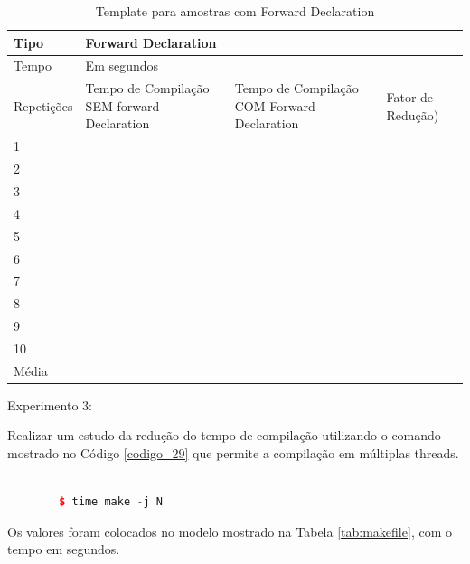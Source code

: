 \begin{table}[h]
\centering
\begin{tabular}{|l|p{3cm}|p{3cm}|p{3cm}|}
\hline
Tipo       & \multicolumn{3}{l|}{Forward Declaration}                                                                                                                            \\ \hline
Tempo      & \multicolumn{3}{l|}{Em segundos}                                                                                                                                    \\ \hline
Repetições & Tempo de Compilação SEM forward Declaration & Tempo de Compilação COM Forward Declaration & Fator de Redução) \\ \hline
1 &  &  &  \\ \hline
2 &  &  &  \\ \hline
3 &  &  &  \\ \hline
4 &  &  &  \\ \hline
5 &  &  &  \\ \hline
6 &  &  &  \\ \hline
7 &  &  &  \\ \hline
8 &  &  &  \\ \hline
9 &  &  &  \\ \hline
10 &  &  &  \\ \hline
Média &  &  &  \\ \hline
\end{tabular}
\caption{Template para amostras com Forward Declaration}
\label{tab:modelo_forward_declaration}
\end{table}



Experimento 3: \label{experimento_03}

Realizar um estudo da redução do tempo de compilação utilizando o comando
 mostrado no Código \ref{codigo_29} que permite a compilação em
 múltiplas threads.


\begin{lstlisting}[language=C++,frame=single,captionpos=b,caption={Execução programa 
								time mais programa make executando com threads},
                                                  			 label=codigo_29]

        $ time make -j N
\end{lstlisting}

Os valores foram colocados no modelo mostrado na Tabela \ref{tab:makefile},
 com o tempo em segundos.

